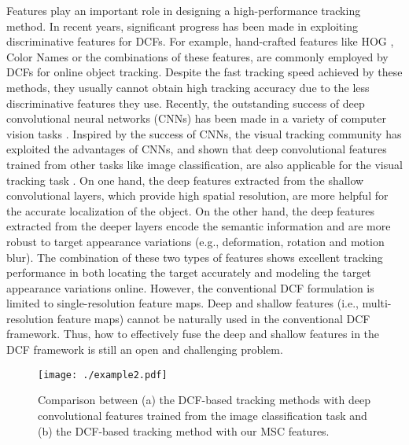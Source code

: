 \documentclass[runningheads]{llncs}
\begin{document}
Features play an important role in designing a high-performance tracking method. In recent years, significant progress has been made in exploiting discriminative features for DCFs. For example, hand-crafted features like HOG \cite{HOG}, Color Names \cite{CN} or the combinations of these features, are commonly employed by DCFs for online object tracking. Despite the fast tracking speed achieved by these methods, they usually cannot obtain high tracking accuracy due to the less discriminative features they use. Recently, the outstanding success of deep convolutional neural networks (CNNs) has been made in a variety of computer vision tasks \cite{KCF,SSD,Deconv}. Inspired by the success of CNNs, the visual tracking community has exploited the advantages of CNNs, and shown that deep convolutional features trained from other tasks like image classification, are also applicable for the visual tracking task \cite{HDT}. On one hand, the deep features extracted from the shallow convolutional layers, which provide high spatial resolution, are more helpful for the accurate localization of the object. On the other hand, the deep features extracted from the deeper layers encode the semantic information and are more robust to target appearance variations (e.g., deformation, rotation and motion blur). The combination of these two types of features shows excellent tracking performance in both locating the target accurately and modeling the target appearance variations online. However, the conventional DCF formulation is limited to single-resolution feature maps. Deep and shallow features (i.e., multi-resolution feature maps) cannot be naturally used in the conventional DCF framework. Thus, how to effectively fuse the deep and shallow features in the DCF framework is still an open and challenging problem.  

\begin{figure*}[!tp]
\begin{center}
   \texttt{[image: ./example2.pdf]} %
\end{center}
 \caption{Comparison between (a) the DCF-based tracking methods \cite{CCOT,HCF} with deep convolutional features trained from the image classification task and (b) the DCF-based tracking method with our MSC features. 
 }
\label{Fig:example}
\end{figure*}
\end{document}
